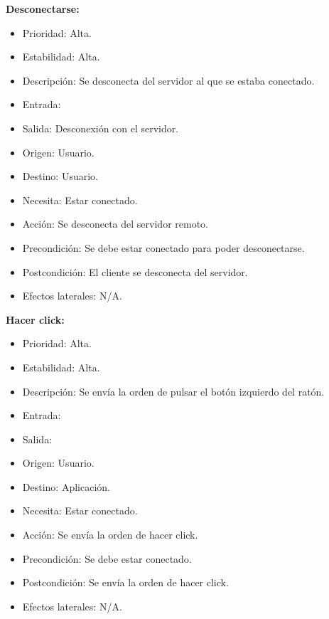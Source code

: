 \textbf{Desconectarse:}
\begin{itemize}
\item Prioridad: Alta.
\item Estabilidad: Alta.
\item Descripción: Se desconecta del servidor al que se estaba conectado.
\item Entrada:
\item Salida: Desconexión con el servidor.
\item Origen: Usuario.
\item Destino: Usuario.
\item Necesita: Estar conectado.
\item Acción: Se desconecta del servidor remoto.
\item Precondición: Se debe estar conectado para poder desconectarse.
\item Postcondición: El cliente se desconecta del servidor.
\item Efectos laterales: N/A.\\

\end{itemize}

\textbf{Hacer click:}
\begin{itemize}
\item Prioridad: Alta.
\item Estabilidad: Alta.
\item Descripción: Se envía la orden de pulsar el botón izquierdo del ratón.
\item Entrada:
\item Salida:
\item Origen: Usuario.
\item Destino: Aplicación.
\item Necesita: Estar conectado.
\item Acción: Se envía la orden de hacer click.
\item Precondición: Se debe estar conectado.
\item Postcondición: Se envía la orden de hacer click.
\item Efectos laterales: N/A.\\

\end{itemize}

